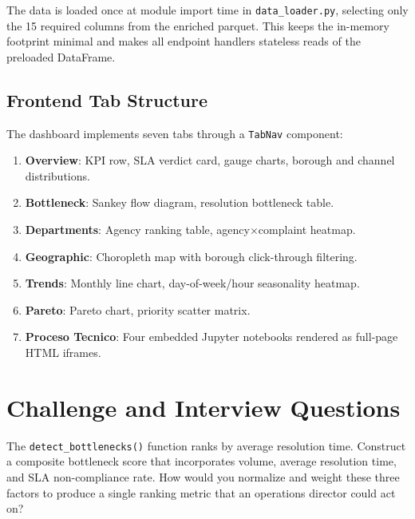 The data is loaded once at module import time in \texttt{data\_loader.py}, selecting only the 15 required columns from the enriched parquet. This keeps the in-memory footprint minimal and makes all endpoint handlers stateless reads of the preloaded DataFrame.

\subsection{Frontend Tab Structure}

The dashboard implements seven tabs through a \texttt{TabNav} component:

\begin{enumerate}
  \item \textbf{Overview}: KPI row, SLA verdict card, gauge charts, borough and channel distributions.
  \item \textbf{Bottleneck}: Sankey flow diagram, resolution bottleneck table.
  \item \textbf{Departments}: Agency ranking table, agency$\times$complaint heatmap.
  \item \textbf{Geographic}: Choropleth map with borough click-through filtering.
  \item \textbf{Trends}: Monthly line chart, day-of-week/hour seasonality heatmap.
  \item \textbf{Pareto}: Pareto chart, priority scatter matrix.
  \item \textbf{Proceso Tecnico}: Four embedded Jupyter notebooks rendered as full-page HTML iframes.
\end{enumerate}

\section{Challenge and Interview Questions}
\label{sec:ops-questions}

\begin{challengebox}
The \texttt{detect\_bottlenecks()} function ranks by average resolution time. Construct a composite bottleneck score that incorporates volume, average resolution time, and SLA non-compliance rate. How would you normalize and weight these three factors to produce a single ranking metric that an operations director could act on?
\end{challengebox}

